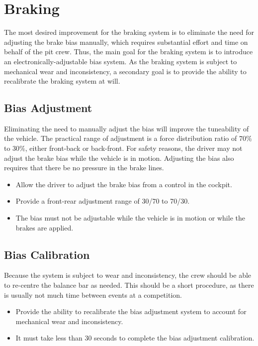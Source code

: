 \section{Braking}

The most desired improvement for the braking system is to eliminate the need for adjusting the brake bias manually, which requires substantial effort and time on behalf of the pit crew. Thus, the main goal for the braking system is to introduce an electronically-adjustable bias system. As the braking system is subject to mechanical wear and inconsistency, a secondary goal is to provide the ability to recalibrate the braking system at will.

\subsection{Bias Adjustment}

Eliminating the need to manually adjust the bias will improve the tuneability of the vehicle. The practical range of adjustment is a force distribution ratio of 70\% to 30\%, either front-back or back-front. For safety reasons, the driver may not adjust the brake bias while the vehicle is in motion. Adjusting the bias also requires that there be no pressure in the brake lines.

\begin{itemize}

\item Allow the driver to adjust the brake bias from a control in the cockpit.
\item Provide a front-rear adjustment range of 30/70 to 70/30.
\item The bias must not be adjustable while the vehicle is in motion or while the brakes are applied.

\end{itemize}

\subsection{Bias Calibration}

Because the system is subject to wear and inconsistency, the crew should be able to re-centre the balance bar as needed. This should be a short procedure, as there is usually not much time between events at a competition.

\begin{itemize}

\item Provide the ability to recalibrate the bias adjustment system to account for mechanical wear and inconsistency. 
\item It must take less than 30 seconds to complete the bias adjustment calibration.

\end{itemize}
